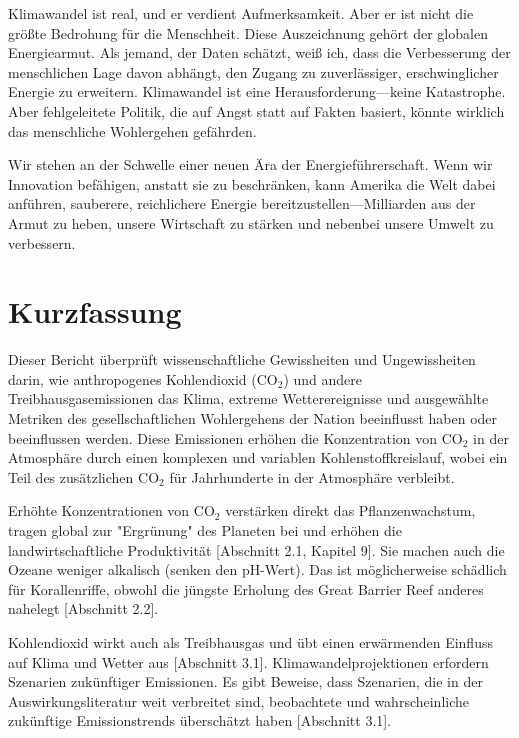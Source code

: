 \documentclass[12pt,paper=a4,DIV=12,parskip=never,chapterprefix=false,headings=standardclasses]{scrreprt}
\begin{document}
Klimawandel ist real, und er verdient Aufmerksamkeit. Aber er ist nicht die größte Bedrohung für die Menschheit. Diese Auszeichnung gehört der globalen Energiearmut. Als jemand, der Daten schätzt, weiß ich, dass die Verbesserung der menschlichen Lage davon abhängt, den Zugang zu zuverlässiger, erschwinglicher Energie zu erweitern. Klimawandel ist eine Herausforderung—keine Katastrophe. Aber fehlgeleitete Politik, die auf Angst statt auf Fakten basiert, könnte wirklich das menschliche Wohlergehen gefährden.

Wir stehen an der Schwelle einer neuen Ära der Energieführerschaft. Wenn wir Innovation befähigen, anstatt sie zu beschränken, kann Amerika die Welt dabei anführen, sauberere, reichlichere Energie bereitzustellen—Milliarden aus der Armut zu heben, unsere Wirtschaft zu stärken und nebenbei unsere Umwelt zu verbessern.

\cleardoublepage
\chapter*{Kurzfassung}
Dieser Bericht überprüft wissenschaftliche Gewissheiten und Ungewissheiten darin, wie anthropogenes Kohlendioxid (CO$_2$) und andere Treibhausgasemissionen das Klima, extreme Wetterereignisse und ausgewählte Metriken des gesellschaftlichen Wohlergehens der Nation beeinflusst haben oder beeinflussen werden. Diese Emissionen erhöhen die Konzentration von CO$_2$ in der Atmosphäre durch einen komplexen und variablen Kohlenstoffkreislauf, wobei ein Teil des zusätzlichen CO$_2$ für Jahrhunderte in der Atmosphäre verbleibt.

Erhöhte Konzentrationen von CO$_2$ verstärken direkt das Pflanzenwachstum, tragen global zur "Ergrünung" des Planeten bei und erhöhen die landwirtschaftliche Produktivität [Abschnitt 2.1, Kapitel 9]. Sie machen auch die Ozeane weniger alkalisch (senken den pH-Wert). Das ist möglicherweise schädlich für Korallenriffe, obwohl die jüngste Erholung des Great Barrier Reef anderes nahelegt [Abschnitt 2.2].

Kohlendioxid wirkt auch als Treibhausgas und übt einen erwärmenden Einfluss auf Klima und Wetter aus [Abschnitt 3.1]. Klimawandelprojektionen erfordern Szenarien zukünftiger Emissionen. Es gibt Beweise, dass Szenarien, die in der Auswirkungsliteratur weit verbreitet sind, beobachtete und wahrscheinliche zukünftige Emissionstrends überschätzt haben [Abschnitt 3.1].
\end{document}
